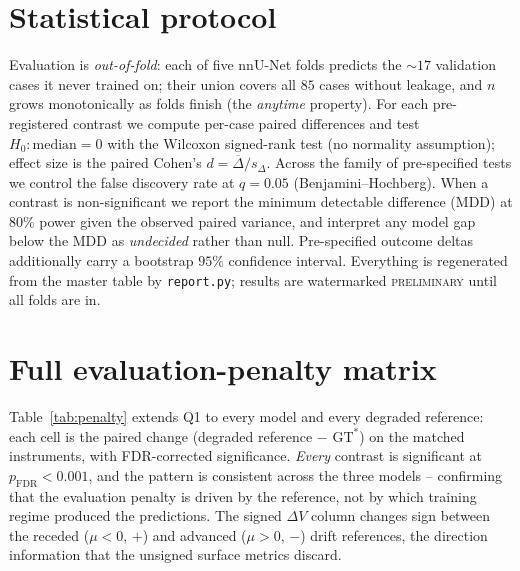 \documentclass[
    bookmarks, bookmarksnumbered, bookmarksopen,
    colorlinks=true, citecolor=blue, linkcolor=blue, urlcolor=blue
]{techrep}
\newcommand{\gtstar}{\ensuremath{\mathrm{GT}^{\!*}}}
\newcommand{\Ncases}{85}   %
\begin{document}
\chapter{Statistical protocol}\label{app:stats}
Evaluation is \emph{out-of-fold}: each of five nnU-Net folds predicts the $\sim17$ validation
cases it never trained on; their union covers all $\Ncases$ cases without leakage, and $n$ grows
monotonically as folds finish (the \emph{anytime} property). For each pre-registered contrast we
compute per-case paired differences and test $H_0:\text{median}=0$ with the Wilcoxon signed-rank
test (no normality assumption); effect size is the paired Cohen's $d=\overline{\Delta}/s_\Delta$.
Across the family of pre-specified tests we control the false discovery rate at $q{=}0.05$
(Benjamini--Hochberg). When a contrast is non-significant we report the minimum detectable
difference (MDD) at $80\%$ power given the observed paired variance, and interpret any
model gap below the MDD as \emph{undecided} rather than null. Pre-specified outcome deltas
additionally carry a bootstrap $95\%$ confidence interval. Everything is regenerated from the
master table by \texttt{report.py}; results are watermarked \textsc{preliminary} until all folds
are in.

\chapter{Full evaluation-penalty matrix}\label{app:penalty}
Table~\ref{tab:penalty} extends Q1 to every model and every degraded reference: each cell is the
paired change (degraded reference $-$ $\gtstar$) on the matched instruments, with FDR-corrected
significance. \emph{Every} contrast is significant at $p_{\text{FDR}}\!<\!0.001$, and the pattern
is consistent across the three models -- confirming that the evaluation penalty is driven by the
reference, not by which training regime produced the predictions. The signed $\Delta V$ column
changes sign between the receded ($\mu{<}0$, $+$) and advanced ($\mu{>}0$, $-$) drift references,
the direction information that the unsigned surface metrics discard.
\end{document}
